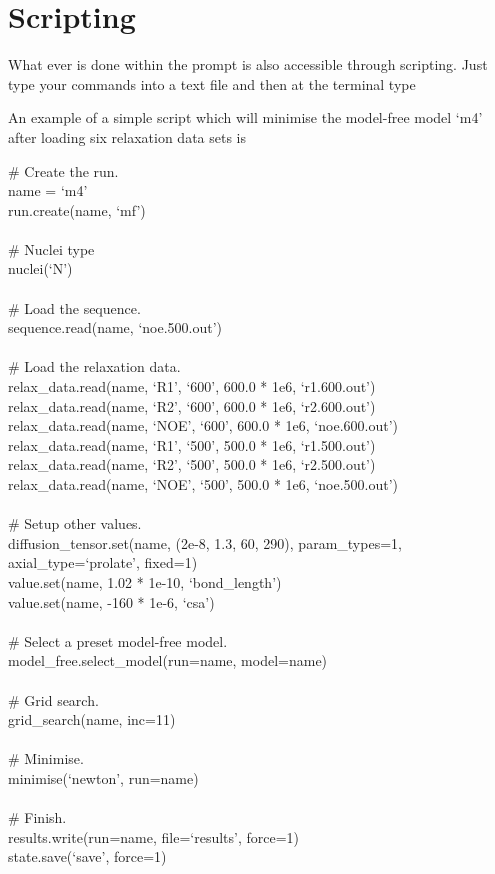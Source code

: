 
\section{Scripting}

What ever is done within the prompt is also accessible through scripting.  Just type your commands into a text file and then at the terminal type


An example of a simple script which will minimise the model-free model `m4' after loading six relaxation data sets is

\begin{exampleenv}
\# Create the run. \\
name = `m4' \\
run.create(name, `mf') \\
 \\
\# Nuclei type \\
nuclei(`N') \\
 \\
\# Load the sequence. \\
sequence.read(name, `noe.500.out') \\
 \\
\# Load the relaxation data. \\
relax\_data.read(name, `R1', `600', 600.0 * 1e6, `r1.600.out') \\
relax\_data.read(name, `R2', `600', 600.0 * 1e6, `r2.600.out') \\
relax\_data.read(name, `NOE', `600', 600.0 * 1e6, `noe.600.out') \\
relax\_data.read(name, `R1', `500', 500.0 * 1e6, `r1.500.out') \\
relax\_data.read(name, `R2', `500', 500.0 * 1e6, `r2.500.out') \\
relax\_data.read(name, `NOE', `500', 500.0 * 1e6, `noe.500.out') \\
 \\
\# Setup other values. \\
diffusion\_tensor.set(name, (2e-8, 1.3, 60, 290), param\_types=1, axial\_type=`prolate', fixed=1) \\
value.set(name, 1.02 * 1e-10, `bond\_length') \\
value.set(name, -160 * 1e-6, `csa') \\
 \\
\# Select a preset model-free model. \\
model\_free.select\_model(run=name, model=name) \\
 \\
\# Grid search. \\
grid\_search(name, inc=11) \\
 \\
\# Minimise. \\
minimise(`newton', run=name) \\
 \\
\# Finish. \\
results.write(run=name, file=`results', force=1) \\
state.save(`save', force=1)
\end{exampleenv}

